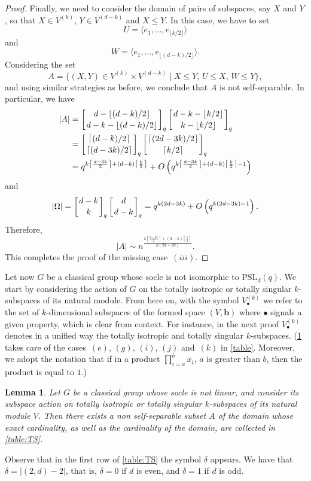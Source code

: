 \documentclass[a4paper]{amsart}
\newtheorem{lemma}[theorem]{Lemma}
\theoremstyle{definition}
\begin{document}
\begin{proof}
    Finally, we need to consider the domain of pairs of subspaces, say $X$ and $Y$, so that $X\in V^{(k)}$, $Y\in V^{(d-k)}$ and $X \le Y$. In this case, we have to set
    \[ U = \langle e_1, \ldots, e_{\lfloor k/2 \rfloor} \rangle\] and
    \[ W = \langle e_1, \ldots, e_{\lfloor (d-k)/2 \rfloor} \rangle.\]
    Considering the set
    \[A = \{ (X,Y) \in V^{(k)}\times V^{(d-k)} \mid X \leq Y,\, U \leq X,\, W \leq Y \},\]
    and using similar strategies as before, we conclude that $A$ is not self-separable.
    In particular, we have
    \begin{align*}
        |A| &= \left[ d- \lfloor (d-k)/2\rfloor \atop d - k -\lfloor (d-k)/2\rfloor \right]_q \left[ d - k - \lfloor k/2\rfloor \atop k -\lfloor k/2\rfloor \right]_q
        \\&= \left[ \lceil (d-k)/2 \rceil \atop \lceil (d-3k)/2\rceil \right]_q \left[ \lceil(2d -3k) /2 \rceil \atop \lceil k/2\rceil \right]_q
        \\&= q^{k \left\lceil \frac{d - 3k}{2} \right\rceil + (d-k) \left\lceil \frac{k}{2} \right\rceil} + O\left(q^{k \left\lceil \frac{d - 3k}{2} \right\rceil + (d-k) \left\lceil \frac{k}{2} \right\rceil - 1}\right)
    \end{align*}
    and
    \[|\Omega| = \left[ d-k \atop k \right]_q\left[ d \atop d-k \right]_q = q^{k(2d-3k)} + O\left( q^{k(2d-3k) -1}\right). \]
    Therefore,
    \[ |A| \sim n^{\frac{k \left\lceil \frac{d - 3k}{2} \right\rceil + (d-k) \left\lceil \frac{k}{2} \right\rceil}{k(2d-3k)}} . \]
    This completes the proof of the missing case~$(iii)$.
\end{proof}

Let now $G$ be a classical group whose socle is not isomorphic to $\mathrm{PSL}_d(q)$. We start by considering the action of $G$ on the totally isotropic or totally singular $k$-subspaces of its natural module. From here on, with the symbol $V_\bullet^{(k)}$ we refer to the set of $k$-dimensional subspaces of the formed space $(V,\mathbf{b})$ where $\bullet$ signals a given property, which is clear from context. For instance, in the next proof $V_\bullet^{(k)}$ denotes in a unified way the totally isotropic and totally singular $k$-subspaces. (\cref{lem:classicalTS} takes care of the cases~$(e)$, $(g)$, $(i)$, $(j)$ and~$(k)$ in \cref{table}. Moreover, we adopt the notation that if in a product $\prod_{i=a}^b x_i$, $a$ is greater than $b$, then the product is equal to $1$.) 

\begin{lemma}\label{lem:classicalTS}
    Let $G$ be a classical group whose socle is not linear, and consider its subspace action on totally isotropic or totally singular $k$-subspaces of its natural module $V$. Then there exists a non self-separable subset $A$ of the domain whose exact cardinality, as well as the cardinality of the domain, are collected in \cref{table:TS}.
\end{lemma}
Observe that in the first row of \cref{table:TS} the symbol $\delta$ appears. We have that $\delta = |(2,d)-2|$, that is, $\delta = 0$ if $d$ is even, and $\delta=1$ if $d$ is odd.
\end{document}

